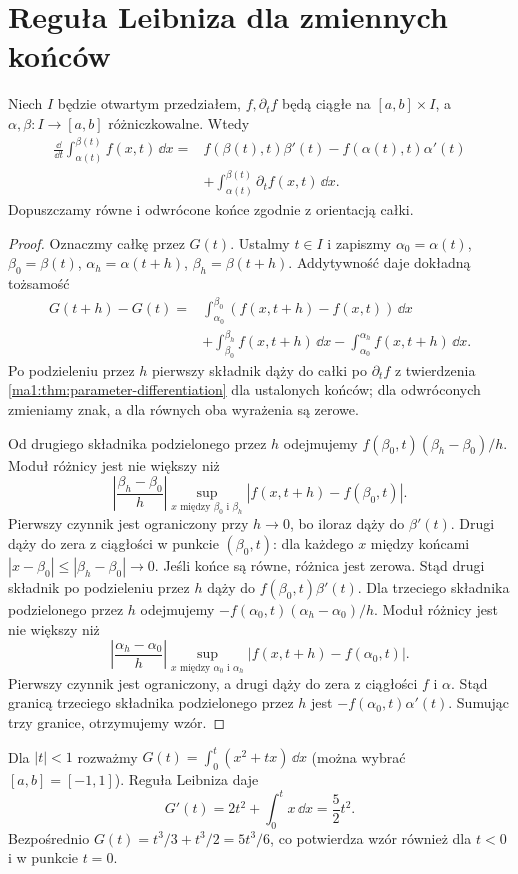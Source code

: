 \section{Reguła Leibniza dla zmiennych końców}
\begin{twierdzenie}
\label{ma1:thm:parameter-leibniz}
Niech $I$ będzie otwartym przedziałem, $f,\partial_t f$ będą ciągłe na $[a,b]\times I$, a $\alpha,\beta:I\to[a,b]$ różniczkowalne. Wtedy
\[
 \begin{split}
 \frac{\dd}{\dd t}\int_{\alpha(t)}^{\beta(t)} f(x,t)\,\dd x
 ={}& f(\beta(t),t)\beta'(t)-f(\alpha(t),t)\alpha'(t)\\
 &+\int_{\alpha(t)}^{\beta(t)}\partial_t f(x,t)\,\dd x.
 \end{split}
\]
Dopuszczamy równe i odwrócone końce zgodnie z orientacją całki.
\end{twierdzenie}
\begin{proof}
Oznaczmy całkę przez $G(t)$. Ustalmy $t\in I$ i zapiszmy $\alpha_0=\alpha(t)$, $\beta_0=\beta(t)$, $\alpha_h=\alpha(t+h)$, $\beta_h=\beta(t+h)$. Addytywność daje dokładną tożsamość
\[
 \begin{split}
 G(t+h)-G(t)={}&
 \int_{\alpha_0}^{\beta_0}(f(x,t+h)-f(x,t))\,\dd x\\
 &+\int_{\beta_0}^{\beta_h}f(x,t+h)\,\dd x
 -\int_{\alpha_0}^{\alpha_h}f(x,t+h)\,\dd x.
 \end{split}
\]
Po podzieleniu przez $h$ pierwszy składnik dąży do całki po $\partial_t f$ z twierdzenia \ref{ma1:thm:parameter-differentiation} dla ustalonych końców; dla odwróconych zmieniamy znak, a dla równych oba wyrażenia są zerowe.

Od drugiego składnika podzielonego przez $h$ odejmujemy
$f(\beta_0,t)(\beta_h-\beta_0)/h$. Moduł różnicy jest nie większy niż
\[
 \left|\frac{\beta_h-\beta_0}{h}\right|
 \sup_{x\text{ między }\beta_0\text{ i }\beta_h}
       |f(x,t+h)-f(\beta_0,t)|.
\]
Pierwszy czynnik jest ograniczony przy $h\to0$, bo iloraz dąży do $\beta'(t)$. Drugi dąży do zera z ciągłości w punkcie $(\beta_0,t)$: dla każdego $x$ między końcami $|x-\beta_0|\le|\beta_h-\beta_0|\to0$. Jeśli końce są równe, różnica jest zerowa. Stąd drugi składnik po podzieleniu przez $h$ dąży do $f(\beta_0,t)\beta'(t)$. Dla trzeciego składnika podzielonego przez $h$ odejmujemy $-f(\alpha_0,t)(\alpha_h-\alpha_0)/h$. Moduł różnicy jest nie większy niż
\[
 \left|\frac{\alpha_h-\alpha_0}{h}\right|
 \sup_{x\text{ między }\alpha_0\text{ i }\alpha_h}|f(x,t+h)-f(\alpha_0,t)|.
\]
Pierwszy czynnik jest ograniczony, a drugi dąży do zera z ciągłości $f$ i $\alpha$. Stąd granicą trzeciego składnika podzielonego przez $h$ jest $-f(\alpha_0,t)\alpha'(t)$. Sumując trzy granice, otrzymujemy wzór.
\end{proof}
\begin{przyklad}
\label{ma1:ex:parameter-leibniz}
Dla $|t|<1$ rozważmy $G(t)=\int_0^t (x^2+tx)\,\dd x$ (można wybrać $[a,b]=[-1,1]$). Reguła Leibniza daje
\[
 G'(t)=2t^2+\int_0^t x\,\dd x=\frac52t^2.
\]
Bezpośrednio $G(t)=t^3/3+t^3/2=5t^3/6$, co potwierdza wzór również dla $t<0$ i w punkcie $t=0$.
\end{przyklad}


